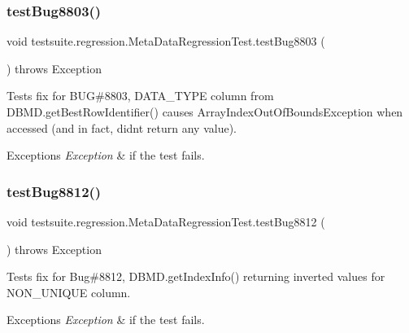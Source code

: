 \subsubsection{\texorpdfstring{test\+Bug8803()}{testBug8803()}}
{\footnotesize\ttfamily void testsuite.\+regression.\+Meta\+Data\+Regression\+Test.\+test\+Bug8803 (\begin{DoxyParamCaption}{ }\end{DoxyParamCaption}) throws Exception}

Tests fix for B\+UG\#8803, \textquotesingle{}D\+A\+T\+A\+\_\+\+T\+Y\+PE\textquotesingle{} column from D\+B\+M\+D.\+get\+Best\+Row\+Identifier() causes Array\+Index\+Out\+Of\+Bounds\+Exception when accessed (and in fact, didn\textquotesingle{}t return any value).


\begin{DoxyExceptions}{Exceptions}
{\em Exception} & if the test fails. \\
\hline
\end{DoxyExceptions}
\mbox{\label{classtestsuite_1_1regression_1_1_meta_data_regression_test_a2e1523fa5764c3a574ab345132d80ccb}} 
\subsubsection{\texorpdfstring{test\+Bug8812()}{testBug8812()}}
{\footnotesize\ttfamily void testsuite.\+regression.\+Meta\+Data\+Regression\+Test.\+test\+Bug8812 (\begin{DoxyParamCaption}{ }\end{DoxyParamCaption}) throws Exception}

Tests fix for Bug\#8812, D\+B\+M\+D.\+get\+Index\+Info() returning inverted values for \textquotesingle{}N\+O\+N\+\_\+\+U\+N\+I\+Q\+UE\textquotesingle{} column.


\begin{DoxyExceptions}{Exceptions}
{\em Exception} & if the test fails. \\
\hline
\end{DoxyExceptions}
\mbox{\label{classtestsuite_1_1regression_1_1_meta_data_regression_test_a85b0332eeddf0448a8813e9e572be277}} 
